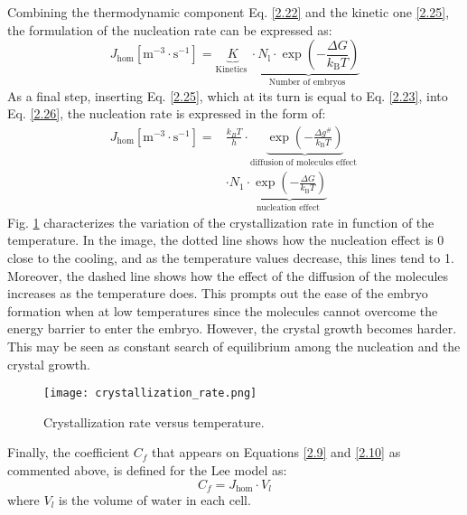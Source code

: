 \setlength{\parindent}{0.5cm} Combining the thermodynamic component Eq. \ref{2.22} and the kinetic one \ref{2.25}, the formulation of the nucleation rate can be expressed as:
\begin{equation}
	\label{2.26}
	J_{\mathrm{hom}}\left[\mathrm{m}^{-3} \cdot \mathrm{s}^{-1}\right]=\underbrace{K}_{\text {Kinetics }} \cdot \underbrace{N_{\mathrm{l}} \cdot \exp \left(-\frac{\Delta G}{k_{\mathrm{B}} T}\right)}_{\text {Number of embryos }}
\end{equation}
As a final step, inserting Eq. \ref{2.25}, which at its turn is equal to Eq. \ref{2.23}, into Eq. \ref{2.26}, the nucleation rate is expressed in the form of:
\begin{equation}
	\label{2.27}
	\begin{aligned}
	J_{\mathrm{hom}}\left[\mathrm{m}^{-3} \cdot \mathrm{s}^{-1}\right]
	=& \frac{k_{B} T}{h} \cdot \underbrace{\exp \left(-\frac{\Delta g^{\#}}{k_{\mathrm{B}} T}\right)}_{\text {diffusion of molecules effect }} \\ 
	& \cdot N_{1} \cdot \underbrace{\exp \left(-\frac{\Delta G}{k_{\mathrm{B}} T}\right)}_{\text {nucleation effect }}
	\end{aligned}
\end{equation}
Fig. \ref{2.2fig} characterizes the variation of the crystallization rate in function of the temperature. In the image, the dotted line shows how the nucleation effect is 0 close to the cooling, and as the temperature values decrease, this lines tend to 1. Moreover, the dashed line shows how the effect of the diffusion of the molecules increases as the temperature does. This prompts out the ease of the embryo formation when at low temperatures since the molecules cannot overcome the energy barrier to enter the embryo. However, the crystal growth becomes harder. This may be seen as constant search of equilibrium among the nucleation and the crystal growth.
\begin{figure}[h!]
	\centering
	\texttt{[image: crystallization\_rate.png]}
	\caption{Crystallization rate versus temperature.}	
	\label{2.2fig}
\end{figure} 
Finally, the coefficient $C_f$ that appears on Equations \ref{2.9} and \ref{2.10} as commented above, is defined for the Lee model as:
\begin{equation}
	\label{2.28}
	C_f=J_{\mathrm{hom}} \cdot V_{l}
\end{equation}
where $V_{l}$ is the volume of water in each cell.

